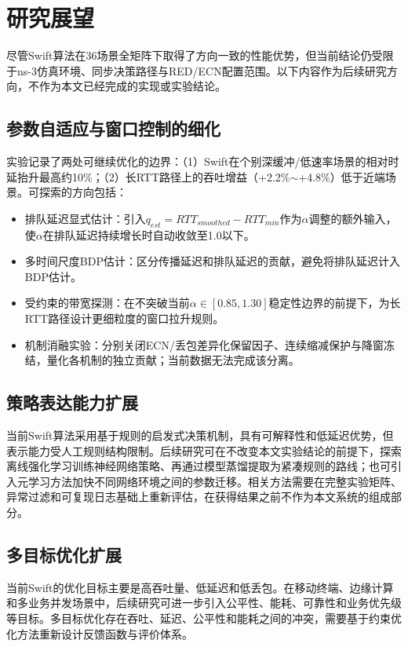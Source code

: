 \section{研究展望}\label{Sec6.2}

尽管Swift算法在36场景全矩阵下取得了方向一致的性能优势，但当前结论仍受限于ns-3仿真环境、同步决策路径与RED/ECN配置范围。以下内容作为后续研究方向，不作为本文已经完成的实现或实验结论。

\subsection{参数自适应与窗口控制的细化}

实验记录了两处可继续优化的边界：（1）Swift在个别深缓冲/低速率场景的相对时延抬升最高约10\%；（2）长RTT路径上的吞吐增益（+2.2\%$\sim$+4.8\%）低于近端场景。可探索的方向包括：

\begin{itemize}
    \item 排队延迟显式估计：引入$q_{est} = RTT_{smoothed} - RTT_{min}$作为$\alpha$调整的额外输入，使$\alpha$在排队延迟持续增长时自动收敛至1.0以下。
    \item 多时间尺度BDP估计：区分传播延迟和排队延迟的贡献，避免将排队延迟计入BDP估计。
    \item 受约束的带宽探测：在不突破当前$\alpha\in[0.85,1.30]$稳定性边界的前提下，为长RTT路径设计更细粒度的窗口拉升规则。
    \item 机制消融实验：分别关闭ECN/丢包差异化保留因子、连续缩减保护与降窗冻结，量化各机制的独立贡献；当前数据无法完成该分离。
\end{itemize}

\subsection{策略表达能力扩展}

当前Swift算法采用基于规则的启发式决策机制，具有可解释性和低延迟优势，但表示能力受人工规则结构限制。后续研究可在不改变本文实验结论的前提下，探索离线强化学习训练神经网络策略、再通过模型蒸馏提取为紧凑规则的路线；也可引入元学习方法加快不同网络环境之间的参数迁移。相关方法需要在完整实验矩阵、异常过滤和可复现日志基础上重新评估，在获得结果之前不作为本文系统的组成部分。

\subsection{多目标优化扩展}

当前Swift的优化目标主要是高吞吐量、低延迟和低丢包。在移动终端、边缘计算和多业务并发场景中，后续研究可进一步引入公平性、能耗、可靠性和业务优先级等目标。多目标优化存在吞吐、延迟、公平性和能耗之间的冲突，需要基于约束优化方法重新设计反馈函数与评价体系。

